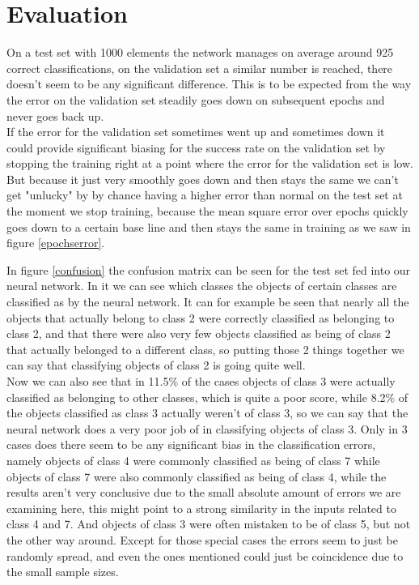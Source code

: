 \section{Evaluation}
\begin{description}[style=unboxed]
    \item[What is the success rate of your network on the test set? How does it compare to the
results of the validation set?]
    On a test set with 1000 elements the network manages on average around 925 correct classifications, on the validation set a similar number is reached, there doesn't seem to be any significant difference. This is to be expected from the way the error on the validation set steadily goes down on subsequent epochs and never goes back up.\\
    If the error for the validation set sometimes went up and sometimes down it could provide significant biasing for the success rate on the validation set by stopping the training right at a point where the error for the validation set is low. But because it just very smoothly goes down and then stays the same we can't get "unlucky" by by chance having a higher error than normal on the test set at the moment we stop training, because the mean square error over epochs quickly goes down to a certain base line and then stays the same in training as we saw in figure \ref{epochserror}.
      \item[Show a confusion matrix of your test set.]
     In figure \ref{confusion} the confusion matrix can be seen for the test set fed into our neural network. In it we can see which classes the objects of certain classes are classified as by the neural network. It can for example be seen that nearly all the objects that actually belong to class 2 were correctly classified as belonging to class 2, and that there were also very few objects classified as being of class 2 that actually belonged to a different class, so putting those 2 things together we can say that classifying objects of class 2 is going quite well.\\
     Now we can also see that in 11.5\% of the cases objects of class 3 were actually classified as belonging to other classes, which is quite a poor score, while 8.2\% of the objects classified as class 3 actually weren't of class 3, so we can say that the neural network does a very poor job of in classifying objects of class 3. Only in 3 cases does there seem to be any significant bias in the classification errors, namely objects of class 4 were commonly classified as being of class 7 while objects of class 7 were also commonly classified as being of class 4, while the results aren't very conclusive due to the small absolute amount of errors we are examining here, this might point to a strong similarity in the inputs related to class 4 and 7. And objects of class 3 were often mistaken to be of class 5, but not the other way around. Except for those special cases the errors seem to just be randomly spread, and even the ones mentioned could just be coincidence due to the small sample sizes.

\end{description}
